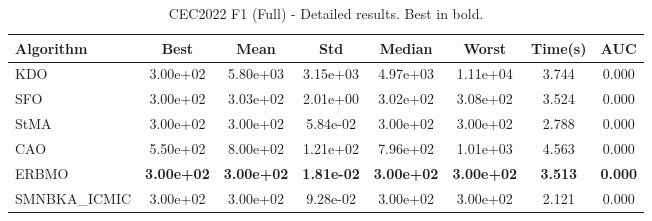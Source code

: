 \begin{table}[H]
\centering\small
\caption{CEC2022 F1 (Full) - Detailed results. Best in bold.}
\label{tab:cec2022_F1}
\begin{tabular}{lccccccc}
\toprule
\textbf{Algorithm} & \textbf{Best} & \textbf{Mean} & \textbf{Std} & \textbf{Median} & \textbf{Worst} & \textbf{Time(s)} & \textbf{AUC} \\
\midrule
KDO & 3.00e+02 & 5.80e+03 & 3.15e+03 & 4.97e+03 & 1.11e+04 & 3.744 & 0.000 \\
SFO & 3.00e+02 & 3.03e+02 & 2.01e+00 & 3.02e+02 & 3.08e+02 & 3.524 & 0.000 \\
StMA & 3.00e+02 & 3.00e+02 & 5.84e-02 & 3.00e+02 & 3.00e+02 & 2.788 & 0.000 \\
CAO & 5.50e+02 & 8.00e+02 & 1.21e+02 & 7.96e+02 & 1.01e+03 & 4.563 & 0.000 \\
ERBMO & \textbf{3.00e+02} & \textbf{3.00e+02} & \textbf{1.81e-02} & \textbf{3.00e+02} & \textbf{3.00e+02} & \textbf{3.513} & \textbf{0.000} \\
SMNBKA_ICMIC & 3.00e+02 & 3.00e+02 & 9.28e-02 & 3.00e+02 & 3.00e+02 & 2.121 & 0.000 \\
\bottomrule
\end{tabular}
\end{table}
